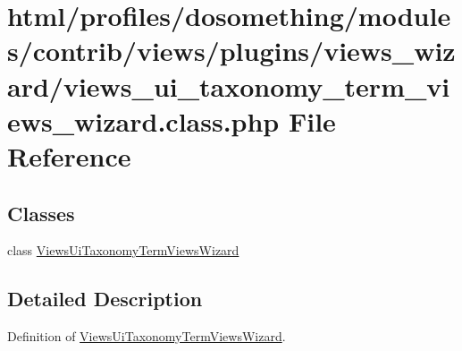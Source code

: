 \hypertarget{views__ui__taxonomy__term__views__wizard_8class_8php}{
\section{html/profiles/dosomething/modules/contrib/views/plugins/views\_\-wizard/views\_\-ui\_\-taxonomy\_\-term\_\-views\_\-wizard.class.php File Reference}
\label{views__ui__taxonomy__term__views__wizard_8class_8php}
}
\subsection*{Classes}
\begin{DoxyCompactItemize}
\item 
class \hyperlink{classViewsUiTaxonomyTermViewsWizard}{ViewsUiTaxonomyTermViewsWizard}
\end{DoxyCompactItemize}


\subsection{Detailed Description}
Definition of \hyperlink{classViewsUiTaxonomyTermViewsWizard}{ViewsUiTaxonomyTermViewsWizard}. 